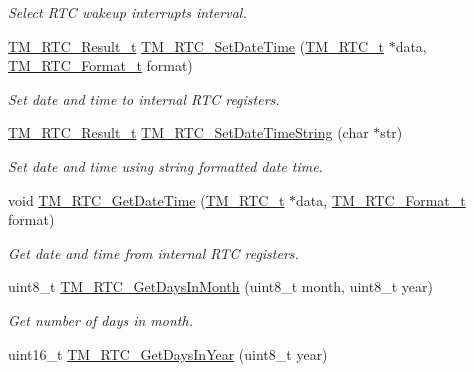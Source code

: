 \begin{DoxyCompactItemize}
\begin{DoxyCompactList}\small\item\em Select R\+T\+C wakeup interrupts interval. \end{DoxyCompactList}\item 
\hyperlink{group___t_m___r_t_c___typedefs_gaad29b647ee0def818f3b9efc717731f8}{T\+M\+\_\+\+R\+T\+C\+\_\+\+Result\+\_\+t} \hyperlink{group___t_m___r_t_c___functions_ga58c057ad43d7b9ab4f3ad85f7e66fc93}{T\+M\+\_\+\+R\+T\+C\+\_\+\+Set\+Date\+Time} (\hyperlink{struct_t_m___r_t_c__t}{T\+M\+\_\+\+R\+T\+C\+\_\+t} $\ast$data, \hyperlink{group___t_m___r_t_c___typedefs_ga4ef7bf7d2c67f2dc6208ecb5926b0354}{T\+M\+\_\+\+R\+T\+C\+\_\+\+Format\+\_\+t} format)
\begin{DoxyCompactList}\small\item\em Set date and time to internal R\+T\+C registers. \end{DoxyCompactList}\item 
\hyperlink{group___t_m___r_t_c___typedefs_gaad29b647ee0def818f3b9efc717731f8}{T\+M\+\_\+\+R\+T\+C\+\_\+\+Result\+\_\+t} \hyperlink{group___t_m___r_t_c___functions_ga6468f31074c15395f5be86a72aa096f0}{T\+M\+\_\+\+R\+T\+C\+\_\+\+Set\+Date\+Time\+String} (char $\ast$str)
\begin{DoxyCompactList}\small\item\em Set date and time using string formatted date time. \end{DoxyCompactList}\item 
void \hyperlink{group___t_m___r_t_c___functions_gac2a333f70db9cdb117255ab6c0e38fa7}{T\+M\+\_\+\+R\+T\+C\+\_\+\+Get\+Date\+Time} (\hyperlink{struct_t_m___r_t_c__t}{T\+M\+\_\+\+R\+T\+C\+\_\+t} $\ast$data, \hyperlink{group___t_m___r_t_c___typedefs_ga4ef7bf7d2c67f2dc6208ecb5926b0354}{T\+M\+\_\+\+R\+T\+C\+\_\+\+Format\+\_\+t} format)
\begin{DoxyCompactList}\small\item\em Get date and time from internal R\+T\+C registers. \end{DoxyCompactList}\item 
uint8\+\_\+t \hyperlink{group___t_m___r_t_c___functions_ga502000f5779e894fb0f0586b0e875a39}{T\+M\+\_\+\+R\+T\+C\+\_\+\+Get\+Days\+In\+Month} (uint8\+\_\+t month, uint8\+\_\+t year)
\begin{DoxyCompactList}\small\item\em Get number of days in month. \end{DoxyCompactList}\item 
uint16\+\_\+t \hyperlink{group___t_m___r_t_c___functions_ga27b98b821e1592bfca5eee2d8dd7d7cb}{T\+M\+\_\+\+R\+T\+C\+\_\+\+Get\+Days\+In\+Year} (uint8\+\_\+t year)

\end{DoxyCompactItemize}
